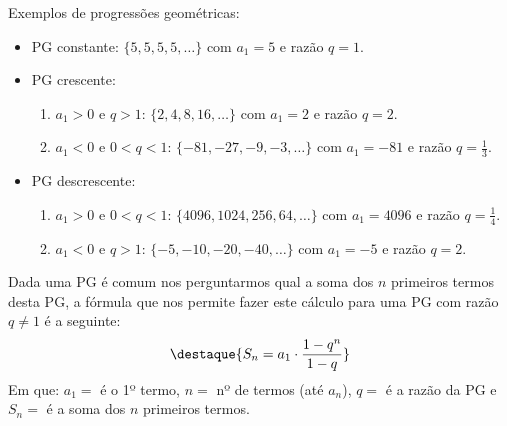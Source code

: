  \begin{exem} Exemplos de progressões geométricas:
  \begin{itemize}
   \item PG constante: $\{5, 5, 5, 5, \ldots \}$ com $a_1= 5$ e razão $q= 1$.
   \item PG crescente:
   \begin{enumerate}
   \item $a_1 > 0$ e $q > 1$: $\{2, 4, 8, 16, \ldots \}$ com $a_1= 2$ e razão $q= 2$.
   \item $a_1 < 0$ e $0 < q < 1$: $\{-81, -27, -9, -3, \ldots \}$ com $a_1= -81$ e razão $q= \frac{1}{3}$.
   \end{enumerate}
   \item PG descrescente:
    \begin{enumerate}
   \item $a_1 > 0$ e $0 < q < 1$: $\{4096, 1024, 256, 64, \ldots \}$ com $a_1= 4096$ e razão $q= \frac{1}{4}$.
   \item $a_1 < 0$ e $q > 1$: $\{-5, -10, -20, -40, \ldots \}$ com $a_1= -5$ e razão $q= 2$.
   \end{enumerate}
  \end{itemize}
 \end{exem}

 Dada uma PG é comum nos perguntarmos qual a soma dos $n$ primeiros termos desta PG, a fórmula que nos permite fazer este cálculo para uma PG com razão $q \neq 1$ é a seguinte:
 \[\destaque{S_n= a_1 \cdot \frac{ 1 - q^n}{1 - q}}\]
 Em que: $a_1=$ é o 1º termo, $n=$ nº de termos (até $a_n$), $q=$ é a razão da PG e $S_n=$ é a soma dos $n$ primeiros termos.

\newpage
